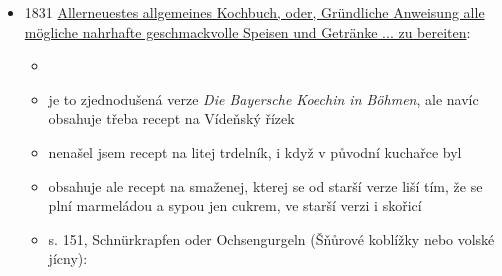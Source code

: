 \begin{itemize}
\begin{itemize}
    \begin{itemize}
    \tightlist
    \item
      dej na vál ½ libry mouky, 8 lotů cukru, 8 lotů utlučených mandlí;
      8 lotů másla nakrájeného na tenké plátky, trochu utlučené skořice,
      hřebíčku, a z jednoho citronu kůru nakrájenou na drobno. Všechno
      to dobře promíchej, přidej do toho 4 žloutky, zadělej těsto. Celé
      těsto vyválej (nebo rozprostři), nakrájej na proužky jeden prst
      dlouhé a čtyři prsty široké. Pak vezmi patřičné želízko, každý
      proužek na něj omotej a upevni provázkem, a tak smaž všechny.
      Usmažené polož ozdobně na mísu a posyp cukrem.
    \item
      to vypadá jako smaženej trdelník, co byl populární po vymizení
      původního, dělanýho na ohni
    \end{itemize}
  \end{itemize}
\item
  1831
  \href{https://ceskadigitalniknihovna.cz/uuid/uuid:23d00200-e1f1-11e4-995b-5ef3fc9ae867}{Allerneuestes
  allgemeines Kochbuch, oder, Gründliche Anweisung alle mögliche
  nahrhafte geschmackvolle Speisen und Getränke ... zu bereiten}:

  \begin{itemize}
  \tightlist
  \item
  \item
    je to zjednodušená verze \emph{Die Bayersche Koechin in Böhmen}, ale
    navíc obsahuje třeba recept na Vídeňský řízek
  \item
    nenašel jsem recept na litej trdelník, i když v původní kuchařce byl
  \item
    obsahuje ale recept na smaženej, kterej se od starší verze liší tím,
    že se plní marmeládou a sypou jen cukrem, ve starší verzi i skořicí
  \item
    s. 151,  Schnürkrapfen oder Ochsengurgeln (Šňůrové
    koblížky nebo volské jícny):


\end{itemize}
\end{itemize}
